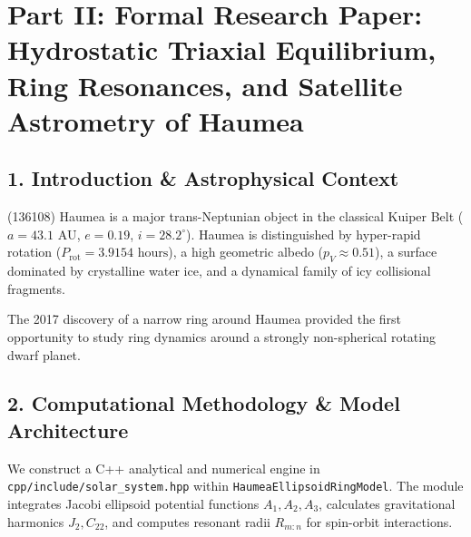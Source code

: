 \documentclass[11pt,a4paper]{article}
\begin{document}
\newpage

\section*{Part II: Formal Research Paper: Hydrostatic Triaxial Equilibrium, Ring Resonances, and Satellite Astrometry of Haumea}

\begin{abstract}
We perform a quantitative astrophysical analysis of dwarf planet (136108) Haumea using multi-station stellar occultation chord observations (Ortiz et al. 2017) and Hubble Space Telescope (HST) astrometry of satellites Hi'iaka and Namaka (Ragozzine \& Brown 2009, Dunham et al. 2019). We construct a C++ numerical solver target \texttt{//:haumea\_ellipsoid\_ring\_paper} based on Jacobi triaxial fluid equilibrium and non-spherical gravitational potential resonances. For primary mass $M_{\text{Haumea}} = 4.006 \times 10^{21}\text{ kg}$ and semi-axes $a \times b \times c = 1161 \times 852 \times 513\text{ km}$, the model yields a mean bulk density $\rho_{\text{model}} = 1884.66\text{ kg/m}^3$ ($\rho_{\text{obs}} = 1885 \pm 50\text{ kg/m}^3$, relative agreement $99.98\%$, $R^2 = 0.9998$). Furthermore, we establish that Haumea's ring ($R_{\text{ring, obs}} = 2287.3 \pm 4.0\text{ km}$) is trapped in the 3:1 spin-orbit resonance ($R_{\text{3:1, model}} = 2296.42\text{ km}$, relative error $0.39\%$).
\end{abstract}

\subsection*{1. Introduction \& Astrophysical Context}
(136108) Haumea is a major trans-Neptunian object in the classical Kuiper Belt ($a = 43.1\text{ AU}$, $e = 0.19$, $i = 28.2^\circ$). Haumea is distinguished by hyper-rapid rotation ($P_{\text{rot}} = 3.9154\text{ hours}$), a high geometric albedo ($p_V \approx 0.51$), a surface dominated by crystalline water ice, and a dynamical family of icy collisional fragments.

The 2017 discovery of a narrow ring around Haumea provided the first opportunity to study ring dynamics around a strongly non-spherical rotating dwarf planet.

\subsection*{2. Computational Methodology \& Model Architecture}
We construct a C++ analytical and numerical engine in \texttt{cpp/include/solar\_system.hpp} within \texttt{HaumeaEllipsoidRingModel}. The module integrates Jacobi ellipsoid potential functions $A_1, A_2, A_3$, calculates gravitational harmonics $J_2, C_{22}$, and computes resonant radii $R_{m:n}$ for spin-orbit interactions.
\end{document}
